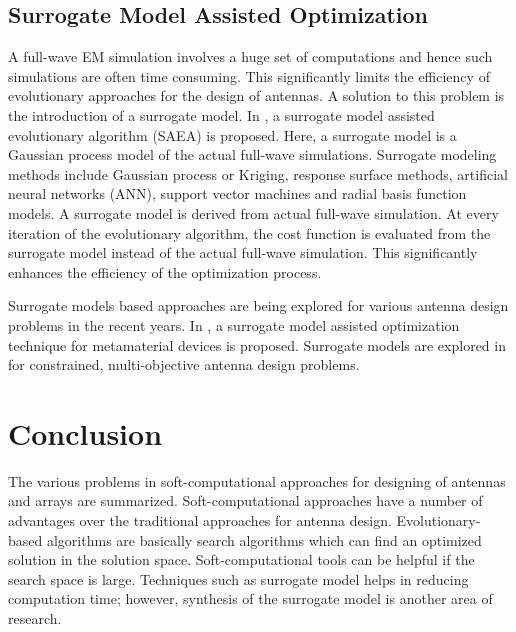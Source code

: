 \subsection{Surrogate Model Assisted Optimization}
A full-wave EM simulation involves a huge set of computations and hence such simulations are often time consuming. This significantly limits the efficiency of evolutionary approaches for the design of antennas. A solution to this problem is the introduction of a surrogate model. In \cite{antSurrD01}, a surrogate model assisted evolutionary algorithm (SAEA) is proposed. Here, a surrogate model is a Gaussian process model of the actual full-wave simulations. Surrogate modeling methods include Gaussian process or Kriging, response surface methods, artificial neural networks (ANN), support vector machines and radial basis function models. A surrogate model is derived from actual full-wave simulation. At every iteration of the evolutionary algorithm, the cost function is evaluated from the surrogate model instead of the actual full-wave simulation. This significantly enhances the efficiency of the optimization process.

Surrogate models based approaches are being explored for various antenna design problems in the recent years. In \cite{surrMTM01}, a surrogate model assisted optimization technique for metamaterial devices is proposed. Surrogate models are explored in \cite{antSurrConstMO} for constrained, multi-objective antenna design problems.

\section{Conclusion}\label{c2sec_cncl}
The various problems in soft-computational approaches for designing of antennas and arrays are summarized. Soft-computational approaches have a number of advantages over the traditional approaches for antenna design. Evolutionary-based algorithms are basically search algorithms which can find an optimized solution in the solution space. Soft-computational tools can be helpful if the search space is large. Techniques such as surrogate model helps in reducing computation time; however, synthesis of the surrogate model is another area of research.
